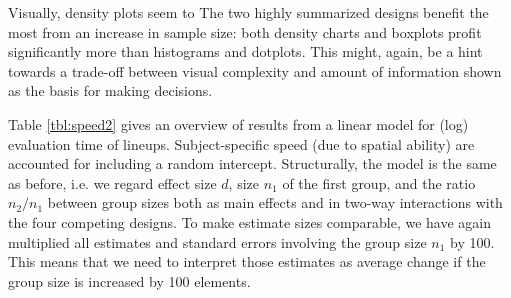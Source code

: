Visually, density plots seem to 
The two highly summarized designs benefit the most from an increase in sample size: both density charts and boxplots profit significantly more than histograms and dotplots. This might, again, be a hint towards a trade-off between visual complexity and amount of information shown as the basis for making decisions. 


Table \ref{tbl:speed2} gives an overview of results from a linear model for (log) evaluation time of lineups. Subject-specific speed (due to spatial ability) are accounted for  including a random intercept. Structurally, the model is the same as before, i.e. we regard effect size $d$, size $n_1$ of the first group, and the ratio $n_2/n_1$ between group sizes both as main effects and in two-way interactions with the four competing designs. To make estimate sizes comparable, we have again multiplied all estimates and standard errors involving the group size $n_1$ by 100. This means that we need to interpret those  estimates as average change if the group size is increased by 100 elements. 

